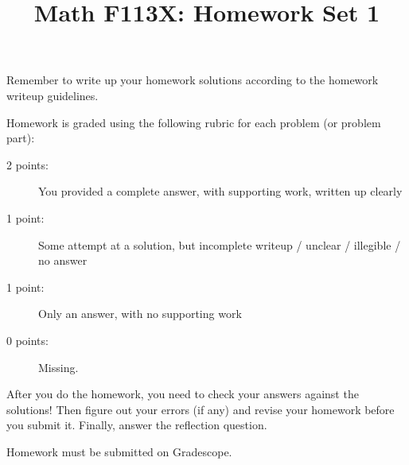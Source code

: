 \documentclass[11pt, oneside]{article}   	%
\title{Math F113X: Homework Set 1}
\date{}							%
\begin{document}
\maketitle



Remember to write up your homework solutions according to the homework writeup guidelines. 

Homework is graded using the following rubric for each problem (or problem part):

\begin{description}
\item[2 points:] You provided a complete answer, with supporting work, written up clearly
\item[1 point:] Some attempt at a solution, but incomplete writeup / unclear / illegible / no answer
\item[1 point:] Only an answer, with no supporting work 
\item[0 points:] Missing.
\end{description}

After you do the homework, you need to check your answers against the solutions! Then figure out your errors (if any) and revise your homework before you submit it. Finally, answer the reflection question.

Homework must be submitted on Gradescope.
\end{document}
